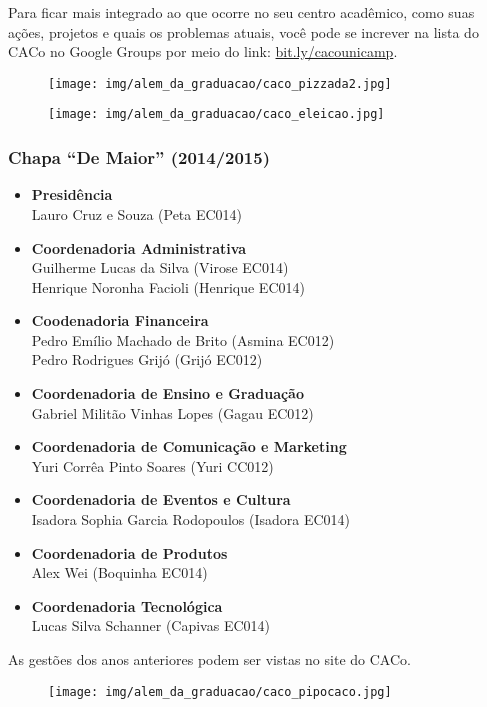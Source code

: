 Para ficar mais integrado ao que ocorre no seu centro acadêmico, como suas
ações, projetos e quais os problemas atuais, você pode se increver na lista do
CACo no Google Groups por meio do link:
\url{bit.ly/cacounicamp}.

\begin{figure}[H]
    \centering
    \texttt{[image: img/alem\_da\_graduacao/caco\_pizzada2.jpg]}
\end{figure}

\begin{figure}[H]
    \centering
    \texttt{[image: img/alem\_da\_graduacao/caco\_eleicao.jpg]}
\end{figure}

\subsubsection*{Chapa ``De Maior'' (2014/2015)}

\begin{itemize}
    \item   \textbf{Presidência}
        \\Lauro Cruz e Souza (Peta EC014)

    \item   \textbf{Coordenadoria Administrativa}
        \\Guilherme Lucas da Silva (Virose EC014)
        \\Henrique Noronha Facioli (Henrique EC014)

    \item   \textbf{Coodenadoria Financeira}
        \\Pedro Emílio Machado de Brito (Asmina EC012)
        \\Pedro Rodrigues Grijó (Grijó EC012)

    \item   \textbf{Coordenadoria de Ensino e Graduação}
        \\Gabriel Militão Vinhas Lopes (Gagau EC012)

    \item   \textbf{Coordenadoria de Comunicação e Marketing}
        \\Yuri Corrêa Pinto Soares (Yuri CC012)
        
    \item   \textbf{Coordenadoria de Eventos e Cultura}
        \\Isadora Sophia Garcia Rodopoulos (Isadora EC014)

    \item   \textbf{Coordenadoria de Produtos}
        \\Alex Wei (Boquinha EC014)

    \item    \textbf{Coordenadoria Tecnológica}
        \\Lucas Silva Schanner (Capivas EC014)
\end{itemize}

As gestões dos anos anteriores podem ser vistas no site do CACo.

\begin{figure}[H]
    \centering
    \texttt{[image: img/alem\_da\_graduacao/caco\_pipocaco.jpg]}
\end{figure}
